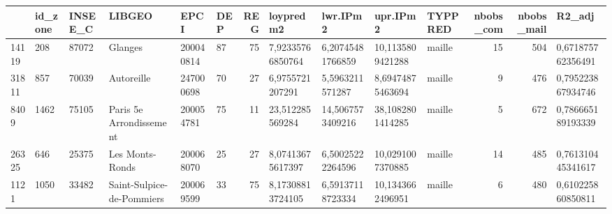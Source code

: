 \begin{tabular}{llllllrllllrrl}
\toprule
{} & id\_zone & INSEE\_C &                     LIBGEO &       EPCI & DEP &  REG &         loypredm2 &          lwr.IPm2 &          upr.IPm2 & TYPPRED &  nbobs\_com &  nbobs\_mail &             R2\_adj \\
\midrule
14119 &     208 &   87072 &                    Glanges &  200040814 &  87 &   75 &  7,92335766850764 &  6,20745481766859 &  10,1135809421288 &  maille &         15 &         504 &  0,671875762356491 \\
31811 &     857 &   70039 &                 Autoreille &  247000698 &  70 &   27 &   6,9755721207291 &   5,5963211571287 &  8,69474875463694 &  maille &          9 &         476 &  0,795223867934746 \\
8409  &    1462 &   75105 &    Paris 5e Arrondissement &  200054781 &  75 &   11 &   23,512285569284 &  14,5067573409216 &  38,1082801414285 &  maille &          5 &         672 &  0,786665189193339 \\
26325 &     646 &   25375 &            Les Monts-Ronds &  200068070 &  25 &   27 &  8,07413675617397 &  6,50025222264596 &  10,0291007370885 &  maille &         14 &         485 &  0,761310445341617 \\
1121  &    1050 &   33482 &  Saint-Sulpice-de-Pommiers &  200069599 &  33 &   75 &  8,17308813724105 &  6,59137118723334 &  10,1343662496951 &  maille &          6 &         480 &  0,610225860850811 \\
\bottomrule
\end{tabular}
